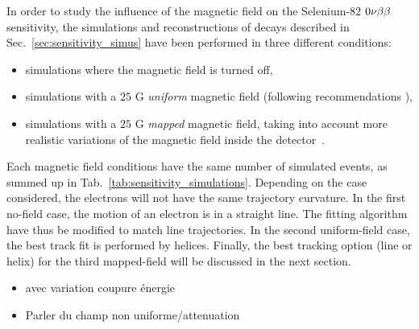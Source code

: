 In order to study the influence of the magnetic field on the Selenium-$82$ $0\nu\beta\beta$ sensitivity, the simulations and reconstructions of decays described in Sec.~\ref{sec:sensitivity_simus} have been performed in three different conditions:
\begin{itemize}
\item simulations where the magnetic field is turned off,
\item simulations with a $25$ G \emph{uniform} magnetic field (following recommendations \cite{CalvezThesis}),
\item simulations with a $25$ G \emph{mapped} magnetic field, taking into account more realistic variations of the magnetic field inside the detector~\cite{docdb:map_magnetic_field2015}.
\end{itemize}
Each magnetic field conditions have the same number of simulated events, as summed up in Tab.~\ref{tab:sensitivity_simulations}.
Depending on the case considered, the electrons will not have the same trajectory curvature.
In the first no-field case, the motion of an electron is in a straight line.
The fitting algorithm have thus be modified to match line trajectories.
In the second uniform-field case, the best track fit is performed by helices.
Finally, the best tracking option (line or helix) for the third mapped-field will be discussed in the next section.



\begin{itemize}
\item avec variation coupure énergie\\
\item Parler du champ non uniforme/attenuation
\end{itemize}



